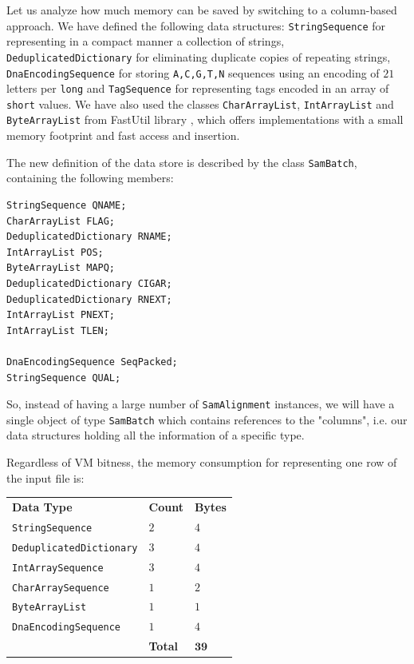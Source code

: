 \documentclass[a4paper,twoside]{article}
\begin{document}
Let us analyze how much memory can be saved by switching to a column-based approach.
We have defined the following data structures: {\tt StringSequence} for representing in a compact manner a collection of strings, {\tt DeduplicatedDictionary} for eliminating duplicate copies of repeating strings, {\tt DnaEncodingSequence} for storing {\tt A,C,G,T,N} sequences using an encoding of $21$ letters per {\tt long} and {\tt TagSequence} for representing tags encoded in an array of {\tt short} values.
We have also used the classes {\tt CharArrayList}, {\tt IntArrayList} and {\tt ByteArrayList} from FastUtil library \cite{fastutil}, which offers implementations with a small memory footprint and fast access and insertion.

The new definition of the data store is described by the class {\tt SamBatch}, containing the following members:
\begin{small}
\begin{verbatim}
StringSequence QNAME;
CharArrayList FLAG;
DeduplicatedDictionary RNAME;
IntArrayList POS;
ByteArrayList MAPQ;
DeduplicatedDictionary CIGAR;
DeduplicatedDictionary RNEXT;
IntArrayList PNEXT;
IntArrayList TLEN;

DnaEncodingSequence SeqPacked;
StringSequence QUAL;
\end{verbatim}
\end{small}

So, instead of having a large number of {\tt SamAlignment} instances, we will have a single object of type {\tt SamBatch} which contains references to the "columns", i.e. our data structures holding all the information of a specific type.


Regardless of VM bitness, the memory consumption for representing one row of the input file is: 
\begin{center}
\begin{tabular}{ l l l }
 {\bf Data Type} 				& {\bf Count} 		& {\bf Bytes} \\ 
 {\tt StringSequence} 			& $2$ 				& $4$ \\ 
 {\tt DeduplicatedDictionary}	& $3$ 				& $4$ \\  
 {\tt IntArraySequence}			& $3$		 		& $4$ \\  
 {\tt CharArraySequence}		& $1$				& $2$ \\  
 {\tt ByteArrayList}			& $1$				& $1$ \\  
 {\tt DnaEncodingSequence}	 	& $1$ 				& $4$ \\
 								& {\bf Total}		& $\mathbf{39}$
\end{tabular}
\end{center}
\end{document}
